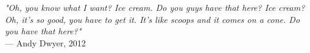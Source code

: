 \begin{flushright}
\emph{"Oh, you know what I want? Ice cream. Do you guys have that here? Ice cream? Oh, it’s so good, you have to get it. It’s like scoops and it comes on a cone. Do you have that here?"}\\
— Andy Dwyer, 2012
\end{flushright}
